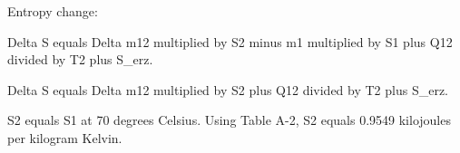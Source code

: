 Entropy change:  

Delta S equals Delta m12 multiplied by S2 minus m1 multiplied by S1 plus Q12 divided by T2 plus S_erz.  

Delta S equals Delta m12 multiplied by S2 plus Q12 divided by T2 plus S_erz.  

S2 equals S1 at 70 degrees Celsius. Using Table A-2, S2 equals 0.9549 kilojoules per kilogram Kelvin.